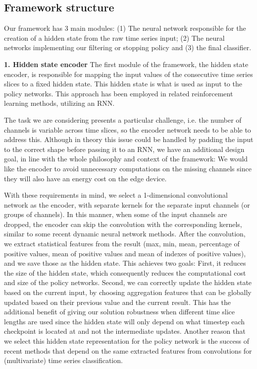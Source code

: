 \documentclass[conference]{IEEEtran}
\begin{document}
 \subsection{Framework structure}\label{subsection:frameworkstruct}
Our framework has 3 main modules: (1) The neural network responsible for the creation of a hidden state from the raw time series input; (2) The neural networks implementing our filtering or stopping policy and (3) the final classifier. 

\textbf{1. Hidden state encoder} The first module of the framework, the hidden state encoder, is responsible for mapping the input values of the consecutive time series slices to a fixed hidden state. This hidden state is what is used as input to the policy networks. This approach has been employed in related reinforcement learning methods\cite{hartvigsen2020recurrent,hartvigsen2022stop}, utilizing an RNN. 

The task we are considering presents a particular challenge, i.e. the number of channels is variable across time slices, so the encoder network needs to be able to address this.
Although in theory this issue could be handled by padding the input to the correct shape before passing it to an RNN, we have an additional design goal, in line with the whole philosophy and context of the framework: We would like the encoder to avoid unnecessary computations on the missing channels since they will also have an energy cost on the edge device.

With these requirements in mind, we select a 1-dimensional convolutional network as the encoder, with separate kernels for the separate input channels (or groups of channels). In this manner, when some of the input channels are dropped, the encoder can skip the convolution with the corresponding kernels, similar to some recent dynamic neural network methods\cite{han2021dynamic}. After the convolution, we extract statistical features from the result (max, min, mean, percentage of positive values, mean of positive values and mean of indexes of positive values), and we save those as the hidden state. This achieves two goals: First, it reduces the size of the hidden state, which consequently reduces the computational cost and size of the policy networks. Second, we can correctly update the hidden state based on the current input, by choosing aggregation features that can be globally updated based on their previous value and the current result. This has the additional benefit of giving our solution robustness when different time slice lengths are used since the hidden state will only depend on what timestep each checkpoint is located at and not the intermediate updates. 
Another reason that we select this hidden state representation for the policy network is the success of recent methods that depend on the same extracted features from convolutions for (multivariate) time series classification\cite{dempster2020rocket,tan2022multirocket,pantiskas2022lightwaves}.
\end{document}
